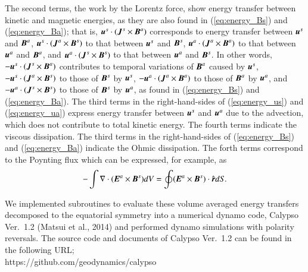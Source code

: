 The second terms, the work by the Lorentz force, show energy transfer between kinetic and magnetic energies, as they are also found in (\ref{eq:energy_Bs}) and (\ref{eq:energy_Ba}); that is, $\mbox{\boldmath$u$}^s \cdot (\mbox{\boldmath$J$}^s \times \mbox{\boldmath$B$}^a)$ corresponds to energy transfer between $\mbox{\boldmath$u$}^s$ and $\mbox{\boldmath$B$}^a$, $\mbox{\boldmath$u$}^s \cdot (\mbox{\boldmath$J$}^a \times \mbox{\boldmath$B$}^s)$ to that between $\mbox{\boldmath$u$}^s$ and $\mbox{\boldmath$B$}^s$, $\mbox{\boldmath$u$}^a \cdot (\mbox{\boldmath$J$}^a \times \mbox{\boldmath$B$}^a)$ to that between $\mbox{\boldmath$u$}^a$ and $\mbox{\boldmath$B$}^a$, and $\mbox{\boldmath$u$}^a \cdot (\mbox{\boldmath$J$}^s \times \mbox{\boldmath$B$}^s)$ to that between $\mbox{\boldmath$u$}^a$ and $\mbox{\boldmath$B$}^s$.
In other words, $-\mbox{\boldmath$u$}^s \cdot (\mbox{\boldmath$J$}^s \times \mbox{\boldmath$B$}^a)$ contributes to temporal variations of $\mbox{\boldmath$B$}^a$ caused by $\mbox{\boldmath$u$}^s$, 
$-\mbox{\boldmath$u$}^s \cdot (\mbox{\boldmath$J$}^a \times \mbox{\boldmath$B$}^s)$ to those of $\mbox{\boldmath$B$}^s$ by $\mbox{\boldmath$u$}^s$,
$-\mbox{\boldmath$u$}^a \cdot (\mbox{\boldmath$J$}^a \times \mbox{\boldmath$B$}^a)$ to those of $\mbox{\boldmath$B$}^a$ by $\mbox{\boldmath$u$}^a$, and 
$-\mbox{\boldmath$u$}^a \cdot (\mbox{\boldmath$J$}^s \times \mbox{\boldmath$B$}^s)$ to those of $\mbox{\boldmath$B$}^s$ by $\mbox{\boldmath$u$}^a$, as found in (\ref{eq:energy_Bs}) and (\ref{eq:energy_Ba}).
The third terms in the right-hand-sides of (\ref{eq:energy_us}) and (\ref{eq:energy_ua}) express energy transfer between $\mbox{\boldmath$u$}^s$ and $\mbox{\boldmath$u$}^a$ due to the advection, which does not contribute to total kinetic energy.
The fourth terms indicate the viscous dissipation. 
The third terms in the right-hand-sides of (\ref{eq:energy_Bs}) and (\ref{eq:energy_Ba}) indicate the Ohmic dissipation.
The forth terms correspond to the Poynting flux which can be expressed, for example, as
%
\begin{equation}
-\int \nabla \cdot
  ( \mbox{\boldmath$E$}^a \times \mbox{\boldmath$B$}^s ) d V =
 \oint (\mbox{\boldmath$E$}^a \times \mbox{\boldmath$B$}^s )
   \cdot \hat{\mbox{\boldmath$r$}} d S .
\label{eq:Poynting}
\end{equation}
%

We implemented subroutines to evaluate these volume averaged energy transfers decomposed to the equatorial symmetry into a numerical dynamo code, Calypso Ver.~1.2 (Matsui et al., 2014) 
and performed dynamo simulations with polarity reversals.
%
The source code and documents of Calypso Ver.~1.2 can be found in the following URL;\\
https://github.com/geodynamics/calypso\\
